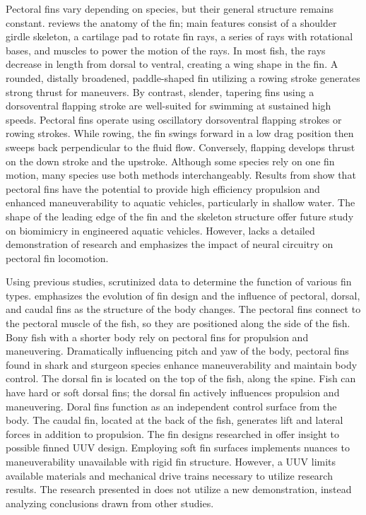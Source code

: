 \documentclass[]{IEEEtran}
\begin{document}
Pectoral fins vary depending on species, but their general structure remains constant.  \cite{westneat2004structure} reviews the anatomy of the fin; main features consist of a shoulder girdle skeleton, a cartilage pad to rotate fin rays, a series of rays with rotational bases, and muscles to power the motion of the rays.   In most fish, the rays decrease in length from dorsal to ventral, creating a wing shape in the fin.  A rounded, distally broadened, paddle-shaped fin utilizing a rowing stroke generates strong thrust for maneuvers.  By contrast, slender, tapering fins using a dorsoventral flapping stroke are well-suited for swimming at sustained high speeds.  Pectoral fins operate using oscillatory dorsoventral flapping strokes or rowing strokes. While rowing, the fin swings forward in a low drag position then sweeps back perpendicular to the fluid flow.  Conversely, flapping develops thrust on the down stroke and the upstroke.  Although some species rely on one fin motion, many species use both methods interchangeably.  Results from \cite{westneat2004structure} show that pectoral fins have the potential to provide high efficiency propulsion and enhanced maneuverability to aquatic vehicles, particularly in shallow water.  The shape of the leading edge of the fin and the skeleton structure offer future study on biomimicry in engineered aquatic vehicles.  However, \cite{westneat2004structure} lacks a detailed demonstration of research and emphasizes the impact of neural circuitry on pectoral fin locomotion.  

Using previous studies, \cite{lauder2004morphology} scrutinized data to determine the function of various fin types.  \cite{lauder2004morphology} emphasizes the evolution of fin design and the influence of pectoral, dorsal, and caudal fins as the structure of the body changes.  The pectoral fins connect to the pectoral muscle of the fish, so they are positioned along the side of the fish.  Bony fish with a shorter body rely on pectoral fins for propulsion and maneuvering.  Dramatically influencing pitch and yaw of the body, pectoral fins found in shark and sturgeon species enhance maneuverability and maintain body control.  The dorsal fin is located on the top of the fish, along the spine.  Fish can have hard or soft dorsal fins; the dorsal fin actively influences propulsion and maneuvering.  Doral fins function as an independent control surface from the body.  The caudal fin, located at the back of the fish, generates lift and lateral forces in addition to propulsion.  The fin designs researched in \cite{lauder2004morphology} offer insight to possible finned UUV design.  Employing soft fin surfaces implements nuances to maneuverability unavailable with rigid fin structure.  However, a UUV limits available materials and mechanical drive trains necessary to utilize research results.  The research presented in \cite{lauder2004morphology} does not utilize a new demonstration, instead analyzing conclusions drawn from other studies.  
\end{document}
